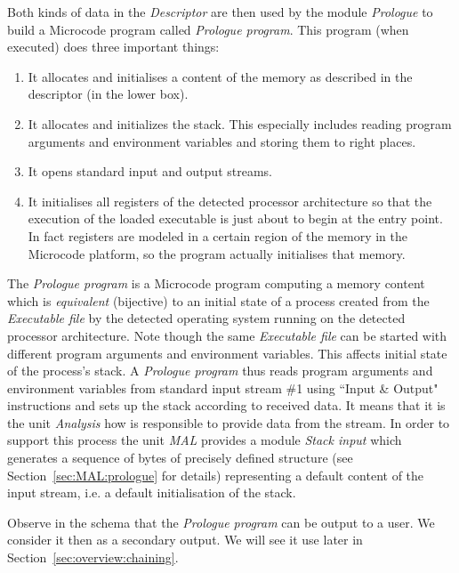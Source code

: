 \documentclass[10pt,twocolumn]{article}
\begin{document}
Both kinds of data in the \emph{Descriptor} are then used by the module
\emph{Prologue} to build a Microcode program called \emph{Prologue program}.
This program (when executed) does three important things:
\begin{enumerate}
\item It allocates and initialises a content of the memory as described in the
descriptor (in the lower box). %
\item It allocates and initializes the stack. This especially includes reading
program arguments and environment variables and storing them to right places. %
\item It opens standard input and output streams.
\item It initialises all registers of the detected processor architecture so
that the execution of the loaded executable is just about to begin at the entry
point. In fact registers are modeled in a certain region of the memory in the
Microcode platform, so the program actually initialises that memory. %
\end{enumerate}
The \emph{Prologue program} is a Microcode program computing a memory content
which is \emph{equivalent} (bijective) to an initial state of a process created
from the \emph{Executable file} by the detected operating system running on the
detected processor architecture. %
Note though the same \emph{Executable file} can be started with different
program arguments and environment variables. This affects initial state of the
process's stack. A \emph{Prologue program} thus reads program arguments and
environment variables from standard input stream \#1 using ``Input \& Output"
instructions and sets up the stack according to received data. It means that it
is the unit \emph{Analysis} how is responsible to provide data from the stream.
In order to support this process the unit \emph{MAL} provides a module
\emph{Stack input} which generates a sequence of bytes of precisely defined
structure (see Section~\ref{sec:MAL:prologue} for details) representing a
default content of the input stream, i.e. a default initialisation of the stack.

Observe in the schema that the \emph{Prologue program} can be output to a user.
We consider it then as a secondary output. We will see it use later in
Section~\ref{sec:overview:chaining}.

\end{document}
